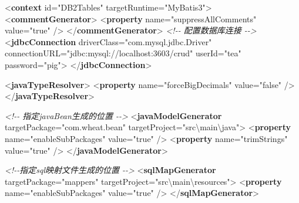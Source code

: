 \documentclass[
]{article}
\newenvironment{Shaded}{}{}
\newcommand{\CommentTok}[1]{\textcolor[rgb]{0.38,0.63,0.69}{\textit{#1}}}
\newcommand{\KeywordTok}[1]{\textcolor[rgb]{0.00,0.44,0.13}{\textbf{#1}}}
\newcommand{\NormalTok}[1]{#1}
\newcommand{\OtherTok}[1]{\textcolor[rgb]{0.00,0.44,0.13}{#1}}
\newcommand{\StringTok}[1]{\textcolor[rgb]{0.25,0.44,0.63}{#1}}
\begin{document}
\begin{Shaded}
\begin{Highlighting}[]
\NormalTok{\textless{}}\KeywordTok{context}\OtherTok{ id=}\StringTok{"DB2Tables"}\OtherTok{ targetRuntime=}\StringTok{"MyBatis3"}\NormalTok{\textgreater{}}
\NormalTok{		\textless{}}\KeywordTok{commentGenerator}\NormalTok{\textgreater{}}
\NormalTok{			\textless{}}\KeywordTok{property}\OtherTok{ name=}\StringTok{"suppressAllComments"}\OtherTok{ value=}\StringTok{"true"}\NormalTok{ /\textgreater{}}
\NormalTok{		\textless{}/}\KeywordTok{commentGenerator}\NormalTok{\textgreater{}}
		\CommentTok{\textless{}!{-}{-} 配置数据库连接 {-}{-}\textgreater{}}
\NormalTok{		\textless{}}\KeywordTok{jdbcConnection}\OtherTok{ driverClass=}\StringTok{"com.mysql.jdbc.Driver"}
\OtherTok{			connectionURL=}\StringTok{"jdbc:mysql://localhost:3603/crud"}\OtherTok{ userId=}\StringTok{"tea"}
\OtherTok{			password=}\StringTok{"pig"}\NormalTok{\textgreater{}}
\NormalTok{		\textless{}/}\KeywordTok{jdbcConnection}\NormalTok{\textgreater{}}

\NormalTok{		\textless{}}\KeywordTok{javaTypeResolver}\NormalTok{\textgreater{}}
\NormalTok{			\textless{}}\KeywordTok{property}\OtherTok{ name=}\StringTok{"forceBigDecimals"}\OtherTok{ value=}\StringTok{"false"}\NormalTok{ /\textgreater{}}
\NormalTok{		\textless{}/}\KeywordTok{javaTypeResolver}\NormalTok{\textgreater{}}

		\CommentTok{\textless{}!{-}{-} 指定javaBean生成的位置 {-}{-}\textgreater{}}
\NormalTok{		\textless{}}\KeywordTok{javaModelGenerator}\OtherTok{ targetPackage=}\StringTok{"com.wheat.bean"}
\OtherTok{			targetProject=}\StringTok{"src\textbackslash{}main\textbackslash{}java"}\NormalTok{\textgreater{}}
\NormalTok{			\textless{}}\KeywordTok{property}\OtherTok{ name=}\StringTok{"enableSubPackages"}\OtherTok{ value=}\StringTok{"true"}\NormalTok{ /\textgreater{}}
\NormalTok{			\textless{}}\KeywordTok{property}\OtherTok{ name=}\StringTok{"trimStrings"}\OtherTok{ value=}\StringTok{"true"}\NormalTok{ /\textgreater{}}
\NormalTok{		\textless{}/}\KeywordTok{javaModelGenerator}\NormalTok{\textgreater{}}

		\CommentTok{\textless{}!{-}{-}指定sql映射文件生成的位置 {-}{-}\textgreater{}}
\NormalTok{		\textless{}}\KeywordTok{sqlMapGenerator}\OtherTok{ targetPackage=}\StringTok{"mappers"}\OtherTok{ targetProject=}\StringTok{"src\textbackslash{}main\textbackslash{}resources"}\NormalTok{\textgreater{}}
\NormalTok{			\textless{}}\KeywordTok{property}\OtherTok{ name=}\StringTok{"enableSubPackages"}\OtherTok{ value=}\StringTok{"true"}\NormalTok{ /\textgreater{}}
\NormalTok{		\textless{}/}\KeywordTok{sqlMapGenerator}\NormalTok{\textgreater{}}


\end{Highlighting}
\end{Shaded}
\end{document}
